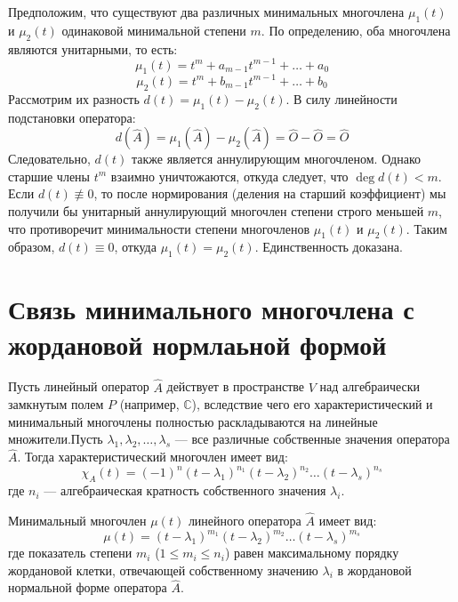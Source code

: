 \documentclass[14pt]{extreport}
\begin{document}
    Предположим, что существуют два различных минимальных многочлена $\mu_1(t)$ и $\mu_2(t)$ одинаковой минимальной степени $m$. По определению, оба многочлена являются унитарными, то есть:$$\mu_1(t) = t^m + a_{m-1} t^{m-1} + \dots + a_0$$$$\mu_2(t) = t^m + b_{m-1} t^{m-1} + \dots + b_0$$Рассмотрим их разность $d(t) = \mu_1(t) - \mu_2(t)$. В силу линейности подстановки оператора:$$d(\hat{A}) = \mu_1(\hat{A}) - \mu_2(\hat{A}) = \hat{O} - \hat{O} = \hat{O}$$Следовательно, $d(t)$ также является аннулирующим многочленом. Однако старшие члены $t^m$ взаимно уничтожаются, откуда следует, что $\deg d(t) < m$. Если $d(t) \not\equiv 0$, то после нормирования (деления на старший коэффициент) мы получили бы унитарный аннулирующий многочлен степени строго меньшей $m$, что противоречит минимальности степени многочленов $\mu_1(t)$ и $\mu_2(t)$. Таким образом, $d(t) \equiv 0$, откуда $\mu_1(t) = \mu_2(t)$. Единственность доказана.

    \section{Связь минимального многочлена с жордановой нормлаьной формой}
    Пусть линейный оператор $\hat{A}$ действует в пространстве $V$ над алгебраически замкнутым полем $P$ (например, $\mathbb{C}$), вследствие чего его характеристический и минимальный многочлены полностью раскладываются на линейные множители.Пусть $\lambda_1, \lambda_2, \dots, \lambda_s$ — все различные собственные значения оператора $\hat{A}$. Тогда характеристический многочлен имеет вид:$$\chi_A(t) = (-1)^n (t - \lambda_1)^{n_1} (t - \lambda_2)^{n_2} \dots (t - \lambda_s)^{n_s}$$где $n_i$ — алгебраическая кратность собственного значения $\lambda_i$.

    \begin{thbox}
        Минимальный многочлен $\mu(t)$ линейного оператора $\hat{A}$ имеет вид:$$\mu(t) = (t - \lambda_1)^{m_1} (t - \lambda_2)^{m_2} \dots (t - \lambda_s)^{m_s}$$где показатель степени $m_i$ ($1 \le m_i \le n_i$) равен максимальному порядку жордановой клетки, отвечающей собственному значению $\lambda_i$ в жордановой нормальной форме оператора $\hat{A}$.
    \end{thbox}
\end{document}
